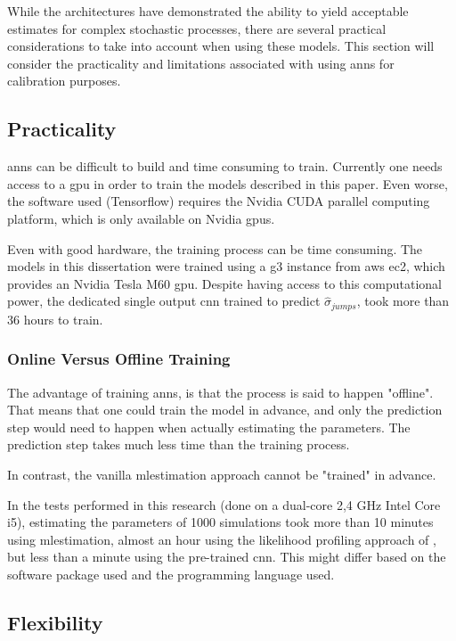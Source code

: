 \documentclass[11pt,oneside,openany,a4paper,english, report, goldenblock
]{usthesis}
\begin{document}
While the architectures have demonstrated the ability to yield acceptable estimates for complex stochastic processes, there are several practical considerations to take into account when using these models. This section will consider the practicality and limitations associated with using \acrshort{ann}s for calibration purposes.

\subsection{Practicality}
\acrshort{ann}s can be difficult to build and time consuming to train. Currently one needs access to a \acrfull{gpu} in order to train the models described in this paper. Even worse, the software used (Tensorflow\texttrademark \xspace \citep{tensorflow2015-whitepaper}) requires the Nvidia CUDA\textregistered \xspace parallel computing platform, which is only available on Nvidia \acrshort{gpu}s.

Even with good hardware, the training process can be time consuming. The models in this dissertation were trained using a g3 instance from \acrfull{aws} \acrfull{ec2}, which provides an Nvidia Tesla M60 \acrshort{gpu}. Despite having access to this computational power, the dedicated single output \acrshort{cnn} trained to predict $\hat{\sigma}_{jumps}$, took more than 36 hours to train.

\subsubsection{Online Versus Offline Training}
The advantage of training \acrshort{ann}s, is that the process is said to happen "offline". That means that one could train the model in advance, and only the prediction step would need to happen when actually estimating the parameters. The prediction step takes much less time than the training process. 

In contrast, the vanilla \acrshort{mlestimation} approach cannot be "trained" in advance. 

In the tests performed in this research (done on a dual-core 2,4 GHz Intel Core i5), estimating the parameters of 1000 simulations took more than 10 minutes using \acrshort{mlestimation}, almost an hour using the likelihood profiling approach of \citet{Honore}, but less than a minute using the pre-trained \acrshort{cnn}. This might differ based on the software package used and the programming language used. 

\subsection{Flexibility}
\end{document}
